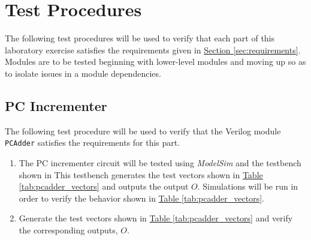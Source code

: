 \section{Test Procedures} %
\label{sec:test_procedures}

The following test procedures will be used to verify that each part of this laboratory exercise satisfies the requirements given in
\hyperref[sec:requirements]{Section \ref*{sec:requirements}}.
Modules are to be tested beginning with lower-level modules
and moving up so as to isolate issues in a module dependencies.

\subsection{PC Incrementer} %
\label{sub:pc_incrementer}

The following test procedure will be used to verify that the Verilog module \verb|PCAdder| satisfies the requirements for this part.

\begin{enumerate}
    \item The PC incrementer circuit will be tested using \emph{ModelSim} and the testbench shown in %
    This testbench generates the test vectors shown in
    \hyperref[tab:pcadder_vectors]{Table \ref*{tab:pcadder_vectors}} and outputs the output $O$.
    Simulations will be run in order to verify the behavior shown in
    \hyperref[tab:pcadder_vectors]{Table \ref*{tab:pcadder_vectors}}.
    \item Generate the test vectors shown in
    \hyperref[tab:pcadder_vectors]{Table \ref*{tab:pcadder_vectors}} and verify the corresponding outputs, $O$.
\end{enumerate}

